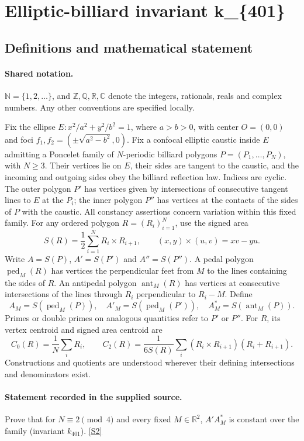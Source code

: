 \documentclass[11pt]{article}
\newcommand{\sref}[2]{\hyperlink{source:#1:#2}{[S#2]}}
\begin{document}
\section{Elliptic-billiard invariant k\_\{401\}}\label{statement}

\subsection{Definitions and mathematical statement}

\paragraph{Shared notation.}$\mathbb N=\{1,2,\ldots\}$, and $\mathbb Z,\mathbb Q,\mathbb R,\mathbb C$ denote the integers, rationals, reals and complex numbers. Any other conventions are specified locally.


Fix the ellipse $E:x^2/a^2+y^2/b^2=1$, where $a>b>0$, with center $O=(0,0)$ and foci $f_1,f_2=(\pm\sqrt{a^2-b^2},0)$. Fix a confocal elliptic caustic inside $E$ admitting a Poncelet family of $N$-periodic billiard polygons $P=(P_1,\ldots,P_N)$, with $N\geq3$. Their vertices lie on $E$, their sides are tangent to the caustic, and the incoming and outgoing sides obey the billiard reflection law. Indices are cyclic. The outer polygon $P'$ has vertices given by intersections of consecutive tangent lines to $E$ at the $P_i$; the inner polygon $P''$ has vertices at the contacts of the sides of $P$ with the caustic. All constancy assertions concern variation within this fixed family.
For any ordered polygon $R=(R_i)_{i=1}^N$, use the signed area
\[S(R)=\frac12\sum_{i=1}^N R_i\times R_{i+1},\qquad (x,y)\times(u,v)=xv-yu.\]
Write $A=S(P)$, $A'=S(P')$ and $A''=S(P'')$. A pedal polygon $\operatorname{ped}_M(R)$ has vertices the perpendicular feet from $M$ to the lines containing the sides of $R$. An antipedal polygon $\operatorname{ant}_M(R)$ has vertices at consecutive intersections of the lines through $R_i$ perpendicular to $R_i-M$. Define
\[A_M=S(\operatorname{ped}_M(P)),\quad A'_M=S(\operatorname{ped}_M(P')),\quad A_M^*=S(\operatorname{ant}_M(P)).\]
Primes or double primes on analogous quantities refer to $P'$ or $P''$. For $R$, its vertex centroid and signed area centroid are
\[C_0(R)=\frac1N\sum_i R_i,\qquad C_2(R)=\frac{1}{6S(R)}\sum_i(R_i\times R_{i+1})(R_i+R_{i+1}).\]
Constructions and quotients are understood wherever their defining intersections and denominators exist.

\paragraph{Statement recorded in the supplied source.}
Prove that for $N\equiv2\pmod4$ and every fixed $M\in\mathbb R^2$, $A'A_M^*$ is constant over the family (invariant $k_{401}$). \sref{statement}{2}
\end{document}
